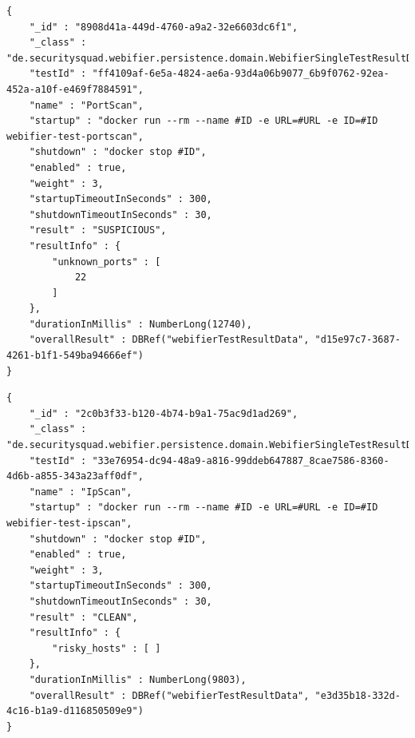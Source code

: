 \newpage

\begin{scriptsize}
\begin{lstlisting}
{
    "_id" : "8908d41a-449d-4760-a9a2-32e6603dc6f1",
    "_class" : "de.securitysquad.webifier.persistence.domain.WebifierSingleTestResultData",
    "testId" : "ff4109af-6e5a-4824-ae6a-93d4a06b9077_6b9f0762-92ea-452a-a10f-e469f7884591",
    "name" : "PortScan",
    "startup" : "docker run --rm --name #ID -e URL=#URL -e ID=#ID webifier-test-portscan",
    "shutdown" : "docker stop #ID",
    "enabled" : true,
    "weight" : 3,
    "startupTimeoutInSeconds" : 300,
    "shutdownTimeoutInSeconds" : 30,
    "result" : "SUSPICIOUS",
    "resultInfo" : {
        "unknown_ports" : [
            22
        ]
    },
    "durationInMillis" : NumberLong(12740),
    "overallResult" : DBRef("webifierTestResultData", "d15e97c7-3687-4261-b1f1-549ba94666ef")
}
\end{lstlisting}
\end{scriptsize}

\begin{scriptsize}
\begin{lstlisting}
{
    "_id" : "2c0b3f33-b120-4b74-b9a1-75ac9d1ad269",
    "_class" : "de.securitysquad.webifier.persistence.domain.WebifierSingleTestResultData",
    "testId" : "33e76954-dc94-48a9-a816-99ddeb647887_8cae7586-8360-4d6b-a855-343a23aff0df",
    "name" : "IpScan",
    "startup" : "docker run --rm --name #ID -e URL=#URL -e ID=#ID webifier-test-ipscan",
    "shutdown" : "docker stop #ID",
    "enabled" : true,
    "weight" : 3,
    "startupTimeoutInSeconds" : 300,
    "shutdownTimeoutInSeconds" : 30,
    "result" : "CLEAN",
    "resultInfo" : {
        "risky_hosts" : [ ]
    },
    "durationInMillis" : NumberLong(9803),
    "overallResult" : DBRef("webifierTestResultData", "e3d35b18-332d-4c16-b1a9-d116850509e9")
}

\end{lstlisting}
\end{scriptsize}

\newpage

